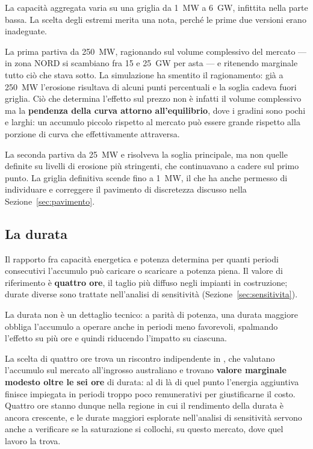 La capacit\`a aggregata varia su una griglia da 1~MW a 6~GW, infittita nella parte bassa.
La scelta degli estremi merita una nota, perch\'e le prime due versioni erano inadeguate.

La prima partiva da 250~MW, ragionando sul volume complessivo del mercato — in zona NORD si
scambiano fra 15 e 25~GW per asta — e ritenendo marginale tutto ci\`o che stava sotto. La
simulazione ha smentito il ragionamento: gi\`a a 250~MW l'erosione risultava di alcuni punti
percentuali e la soglia cadeva fuori griglia. Ci\`o che determina l'effetto sul prezzo non \`e
infatti il volume complessivo ma la \textbf{pendenza della curva attorno all'equilibrio}, dove
i gradini sono pochi e larghi: un accumulo piccolo rispetto al mercato pu\`o essere grande
rispetto alla porzione di curva che effettivamente attraversa.

La seconda partiva da 25~MW e risolveva la soglia principale, ma non quelle definite su
livelli di erosione pi\`u stringenti, che continuavano a cadere sul primo punto. La griglia
definitiva scende fino a 1~MW, il che ha anche permesso di individuare e correggere il
pavimento di discretezza discusso nella Sezione~\ref{sec:pavimento}.

\subsection{La durata}
\label{sec:durata}

Il rapporto fra capacit\`a energetica e potenza determina per quanti periodi consecutivi
l'accumulo pu\`o caricare o scaricare a potenza piena. Il valore di riferimento \`e
\textbf{quattro ore}, il taglio pi\`u diffuso negli impianti in costruzione; durate diverse
sono trattate nell'analisi di sensitivit\`a (Sezione~\ref{sec:sensitivita}).

La durata non \`e un dettaglio tecnico: a parit\`a di potenza, una durata maggiore obbliga
l'accumulo a operare anche in periodi meno favorevoli, spalmando l'effetto su pi\`u ore e
quindi riducendo l'impatto su ciascuna.

La scelta di quattro ore trova un riscontro indipendente in
\textcite{mcconnell2015storage}, che valutano l'accumulo sul mercato all'ingrosso
australiano e trovano \textbf{valore marginale modesto oltre le sei ore} di durata: al di
l\`a di quel punto l'energia aggiuntiva finisce impiegata in periodi troppo poco
remunerativi per giustificarne il costo. Quattro ore stanno dunque nella regione in cui il
rendimento della durata \`e ancora crescente, e le durate maggiori esplorate nell'analisi
di sensitivit\`a servono anche a verificare se la saturazione si collochi, su questo
mercato, dove quel lavoro la trova.

